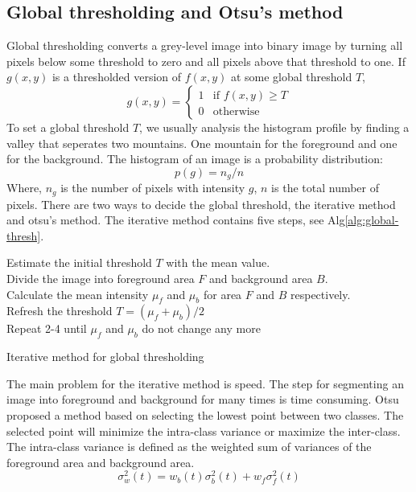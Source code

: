 \subsection{Global thresholding and Otsu's method}
Global thresholding converts a grey-level image into binary image by turning all pixels below some threshold to zero and all pixels above that threshold to one. If $g(x,y)$ is a thresholded version of $f(x,y)$ at some global threshold $T$, 
$$
g(x,y) = \left\{
  \begin{array}{ll}
  1 & \mbox{if } f(x,y) \ge T \\
  0 & \mbox{otherwise}
  \end{array}
  \right.
$$
To set a global threshold $T$, we usually analysis the histogram profile by finding a valley that seperates two mountains. One mountain for the foreground and one for the background. The histogram of an image is a probability distribution:
$$
p(g) = n_g/n
$$
Where, $n_g$ is the number of pixels with intensity $g$, $n$ is the total number of pixels. There are two ways to decide the global threshold, the iterative method and otsu's method. The iterative method contains five steps, see Alg\ref{alg:global-thresh}.\\
\begin{algorithm}
\SetAlgoLined
{}
Estimate the initial threshold $T$ with the mean value.\\
Divide the image into foreground area $F$ and background area $B$.\\
Calculate the mean intensity $\mu_f$ and $\mu_b$ for area $F$ and $B$ respectively.\\
Refresh the threshold $T = (\mu_f + \mu_b)/2$\\
Repeat 2-4 until $\mu_f$ and $\mu_b$ do not change any more
\caption{Iterative method for global thresholding}
\label{alg:global-thresh}
\end{algorithm}
The main problem for the iterative method is speed. The step for segmenting an image into foreground and background for many times is time consuming. Otsu \cite{otsu1975threshold} proposed a method based on selecting the lowest point between two classes. The selected point will minimize the intra-class variance or maximize the inter-class. The intra-class variance is defined as the weighted sum of variances of the foreground area and background area.
\begin{equation} \label{eq:intra-var}
\sigma_w^2(t) = w_b(t)\sigma_b^2(t) + w_f\sigma_f^2(t)
\end{equation}
